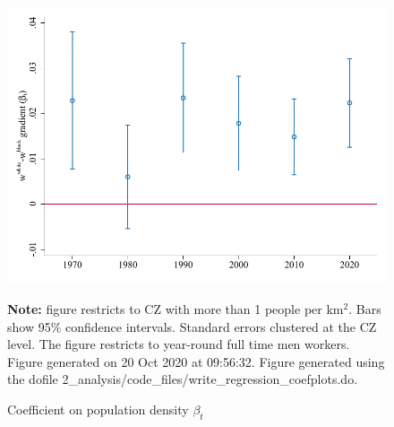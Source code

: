 \begin{figure}[!h]
\centering
\caption{Coefficient on population density $ \beta_t $}
\includegraphics[width=.6\textwidth]{../2_analysis/output/figures/baseline_race_gradients_l_czone_pop_full_time}
\par \begin{minipage}[h]{\textwidth}{\tiny\textbf{Note:} figure restricts to CZ with more than 1 people per km$^2$. Bars show 95\% confidence intervals. Standard errors clustered at the CZ level. The figure restricts to year-round full time men workers. Figure generated on 20 Oct 2020 at 09:56:32. Figure generated using the dofile 2\_analysis/code\_files/write\_regression\_coefplots.do.}\end{minipage}
\end{figure}
